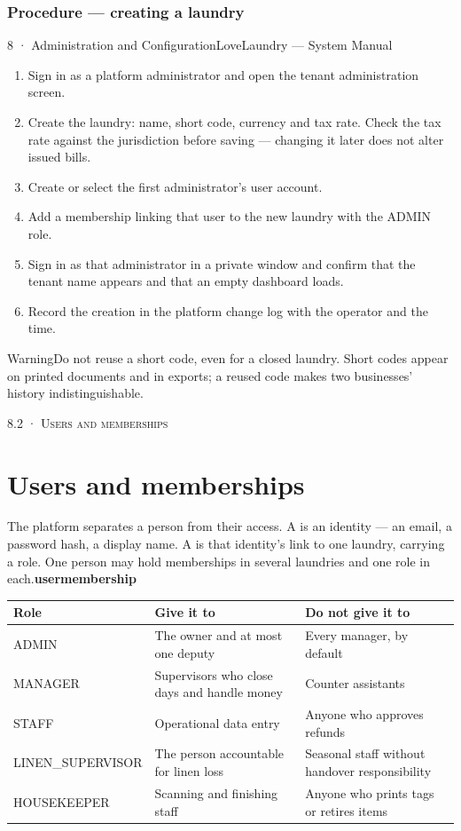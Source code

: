 \documentclass[11pt,a4paper,oneside]{book}
\begin{document}
\subsubsection*{Procedure — creating a laundry}
8 · Administration and ConfigurationLoveLaundry — System Manual

\begin{enumerate}
\item Sign in as a platform administrator and open the tenant administration screen.
\item Create the laundry: name, short code, currency and tax rate. Check the tax rate against the jurisdiction before saving — changing it later does not alter issued bills.
\item Create or select the first administrator's user account.
\item Add a membership linking that user to the new laundry with the ADMIN role.
\item Sign in as that administrator in a private window and confirm that the tenant name appears and that an empty dashboard loads.
\item Record the creation in the platform change log with the operator and the time.
\end{enumerate}
\begin{notebox}WarningDo not reuse a short code, even for a closed laundry. Short codes appear on printed documents and in exports; a reused code makes two businesses' history indistinguishable.\end{notebox}
\textsc{\small\color{crimson}8.2 · Users and memberships}\par\medskip
\section*{Users and memberships}
The platform separates a person from their access. A  is an identity — an email, a password hash, a display name. A  is that identity's link to one laundry, carrying a role. One person may hold memberships in several laundries and one role in each.\textbf{user}\textbf{membership}

\begin{center}\small
\begin{tabularx}{\linewidth}{|X|X|X|}
\hline
\rowcolor{lightgrey}
\textbf{Role} & \textbf{Give it to} & \textbf{Do not give it to} \\ \hline
ADMIN & The owner and at most one deputy & Every manager, by default \\ \hline
MANAGER & Supervisors who close days and handle money & Counter assistants \\ \hline
STAFF & Operational data entry & Anyone who approves refunds \\ \hline
LINEN\_SUPERVISOR & The person accountable for linen loss & Seasonal staff without handover responsibility \\ \hline
HOUSEKEEPER & Scanning and finishing staff & Anyone who prints tags or retires items \\ \hline
\end{tabularx}
\end{center}
\end{document}
